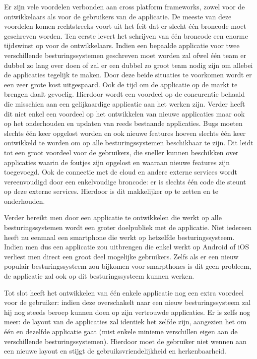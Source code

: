 Er zijn vele voordelen verbonden aan cross platform frameworks, zowel voor de ontwikkelaars als voor de gebruikers van de applicatie. De meeste van deze voordelen komen rechtstreeks voort uit het feit dat er slecht één broncode moet geschreven worden. Ten eerste levert het schrijven van één broncode een enorme tijdswinst op voor de ontwikkelaars. Indien een bepaalde applicatie voor twee verschillende besturingssystemen geschreven moet worden zal ofwel één team er dubbel zo lang over doen of zal er een dubbel zo groot team nodig zijn om allebei de applicaties tegelijk te maken. Door deze beide situaties te voorkomen wordt er een zeer grote kost uitgespaard. Ook de tijd om de applicatie op de markt te brengen daalt gevoelig. Hierdoor wordt een voordeel op de concurentie behaald die misschien aan een gelijkaardige applicatie aan het werken zijn. Verder heeft dit niet enkel een voordeel op het ontwikkelen van nieuwe applicaties maar ook op het onderhouden en updaten van reeds bestaande applicaties. Bugs moeten slechts één keer opgelost worden en ook nieuwe features hoeven slechts één keer ontwikkeld te worden om op alle besturingssystemen beschikbaar te zijn. Dit leidt tot een groot voordeel voor de gebruikers, die sneller kunnen beschikken over applicaties waarin de foutjes zijn opgelost en waaraan nieuwe features zijn toegevoegd. Ook de connectie met de cloud en andere externe services wordt vereenvoudigd door een enkelvoudige broncode: er is slechts één code die steunt op deze externe services. Hierdoor is dit makkelijker op te zetten en te onderhouden.

Verder bereikt men door een applicatie te ontwikkelen die werkt op alle besturingssystemen wordt een groter doelpubliek met de applicatie. Niet iedereen heeft nu eenmaal een smartphone die werkt op hetzelfde besturingssysteem. Indien men dus een applicatie zou uitbrengen die enkel werkt op Android of iOS verliest men direct een groot deel mogelijke gebruikers. Zelfs als er een nieuw populair besturingssysteem zou bijkomen voor smarpthones is dit geen probleem, de applicatie zal ook op dit besturingssysteem kunnen werken.

Tot slot heeft het ontwikkelen van één enkele applicatie nog een extra voordeel voor de gebruiker: indien deze overschakelt naar een nieuw besturingssysteem zal hij nog steeds beroep kunnen doen op zijn vertrouwde applicaties. Er is zelfs nog meer: de layout van de applicaties zal identiek het zelfde zijn, aangezien het om één en dezelfde applicatie gaat (mist enkele minieme verschillen eigen aan de verschillende besturingssystemen). Hierdoor moet de gebruiker niet wennen aan een nieuwe layout en stijgt de gebruiksvriendelijkheid en herkenbaarheid.

